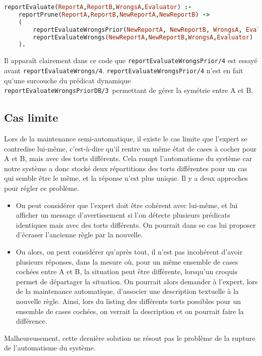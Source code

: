 \begin{lstlisting}[language=Prolog,frame=single]
reportEvaluate(ReportA,ReportB,WrongsA,Evaluator) :-
    reportPrune(ReportA,ReportB,NewReportA,NewReportB) ->
	(
		reportEvaluateWrongsPrior(NewReportA, NewReportB, WrongsA, Evaluator) ;
		reportEvaluateWrongs(NewReportA,NewReportB,WrongsA,Evaluator)
	).
\end{lstlisting}

Il apparaît clairement dans ce code que \texttt{reportEvaluateWrongsPrior/4} est essayé avant \texttt{reportEvaluateWrongs/4}. \texttt{reportEvaluateWrongsPrior/4} n'est en fait qu'une surcouche du prédicat dynamique \texttt{reportEvaluateWrongsPriorDB/3} permettant de gérer la symétrie entre A et B.

\subsection{Cas limite}
Lors de la maintenance semi-automatique, il existe le cas limite que l'expert se contredise lui-même, c'est-à-dire qu'il rentre un même état de cases à cocher pour A et B, mais avec des torts différents. Cela rompt l'automatisme du système car notre système a donc stocké deux répartitions des torts différentes pour un cas qui semble être le même, et la réponse n'est plus unique. Il y a deux approches pour régler ce problème.
\begin{itemize}
	\item On peut considérer que l'expert doit être cohérent avec lui-même, et lui afficher un message d'avertissement si l'on détecte plusieurs prédicats identiques mais avec des torts différents. On pourrait dans se cas lui proposer d'écraser l'ancienne règle par la nouvelle.
	\item Ou alors, on peut considérer qu'après tout, il n'est pas incohérent d'avoir plusieurs réponses, dans la mesure où, pour un même ensemble de cases cochées entre A et B, la situation peut être différente, lorsqu'un croquis permet de départager la situation. On pourrait alors demander à l'expert, lors de la maintenance automatique, d'associer une description textuelle à la nouvelle règle. Ainsi, lors du listing des différents torts possibles pour un ensemble de cases cochées, on verrait la description et on pourrait faire la différence.\\
\end{itemize}

Malheureusement, cette dernière solution ne résout pas le problème de la rupture de l'automatisme du système.

